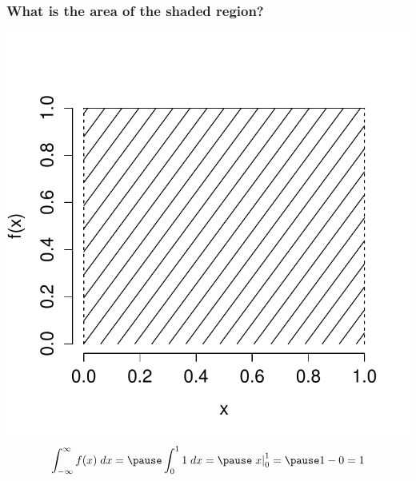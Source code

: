 \documentclass[handout]{beamer}
\begin{document}

\begin{frame}
\frametitle{What is the area of the shaded region?}

\centering
	\includegraphics[scale = 0.4]{./images/uniform_density_shaded}
\begin{eqnarray*}
	\int_{-\infty}^{\infty} f(x) \; dx =\pause\int_{0}^1 1 \; dx = \pause \left. x \right|_0^1 =\pause 1 - 0 = 1
\end{eqnarray*}
\end{frame}


\end{document}

